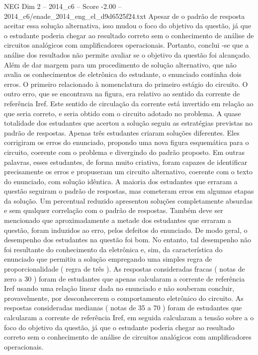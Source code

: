 \begin{textsample}{NEG Dim 2 – 2014\_c6 – Score -2.00 – 2014\_c6/enade\_2014\_eng\_el\_d9d6525f24.txt}
Apesar de o padrão de resposta aceitar essa solução alternativa, isso mudou o foco do objetivo da questão, já que o estudante poderia chegar ao resultado correto sem o conhecimento de análise de circuitos analógicos com amplificadores operacionais.
Portanto, conclui -se que a análise dos resultados não permite avaliar se o objetivo da questão foi alcançado.
Além de dar margem para um procedimento de solução alternativo, que não avalia os conhecimentos de eletrônica do estudante, o enunciado continha dois erros.
O primeiro relacionado à nomenclatura do primeiro estágio do circuito.
O outro erro, que se encontrava na figura, era relativo ao sentido da corrente de referência Iref.
Este sentido de circulação da corrente está invertido em relação ao que seria correto, e seria obtido com o circuito adotado no problema.
A quase totalidade dos estudantes que acertou a solução seguiu as estratégias previstas no padrão de respostas.
Apenas três estudantes criaram soluções diferentes.
Eles corrigiram os erros do enunciado, propondo uma nova figura esquemática para o circuito, coerente com o problema e divergindo do padrão proposto.
Em outras palavras, esses estudantes, de forma muito criativa, foram capazes de identificar precisamente os erros e propuseram um circuito alternativo, coerente com o texto do enunciado, com solução idêntica.
A maioria dos estudantes que erraram a questão seguiram o padrão de respostas, mas cometeram erros em algumas etapas da solução.
Um percentual reduzido apresentou soluções completamente absurdas e sem qualquer correlação com o padrão de respostas.
Também deve ser mencionado que aproximadamente a metade dos estudantes que erraram a questão, foram induzidos ao erro, pelos defeitos do enunciado.
De modo geral, o desempenho dos estudantes na questão foi bom.
No entanto, tal desempenho não foi resultante do conhecimento da eletrônica e, sim, da característica do enunciado que permitiu a solução empregando uma simples regra de proporcionalidade ( regra de três ).
As respostas consideradas fracas ( notas de zero a 30 ) foram de estudantes que apenas calcularam a corrente de referência Iref usando uma relação linear dada no enunciado e não souberam concluir, provavelmente, por desconhecerem o comportamento eletrônico do circuito.
As respostas consideradas medianas ( notas de 35 a 70 ) foram de estudantes que calcularam a corrente de referência Iref, em seguida calcularam a tensão sobre a o foco do objetivo da questão, já que o estudante poderia chegar ao resultado correto sem o conhecimento de análise de circuitos analógicos com amplificadores operacionais.

\end{textsample}
